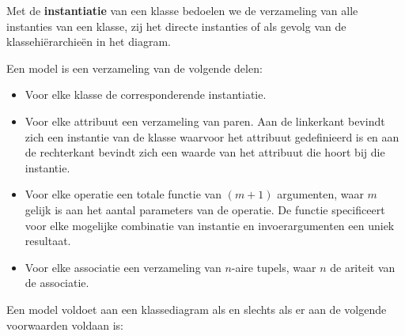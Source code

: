 Met de \textbf{instantiatie} van een klasse bedoelen we de verzameling van alle instanties van een klasse, zij het directe instanties of als gevolg van de klassehi\"erarchie\"en in het diagram.

Een model is een verzameling van de volgende delen:

\begin{itemize}
	\item Voor elke klasse de corresponderende instantiatie.
	\item Voor elke attribuut een verzameling van paren. Aan de linkerkant bevindt zich een instantie van de klasse waarvoor het attribuut gedefinieerd is en aan de rechterkant bevindt zich een waarde van het attribuut die hoort bij die instantie.
	\item Voor elke operatie een totale functie van $(m+1)$ argumenten, waar $m$ gelijk is aan het aantal parameters van de operatie. De functie specificeert voor elke mogelijke combinatie van instantie en invoerargumenten een uniek resultaat.
	\item Voor elke associatie een verzameling van $n$-aire tupels, waar $n$ de ariteit van de associatie.
\end{itemize}

Een model voldoet aan een klassediagram als en slechts als er aan de volgende voorwaarden voldaan is:

